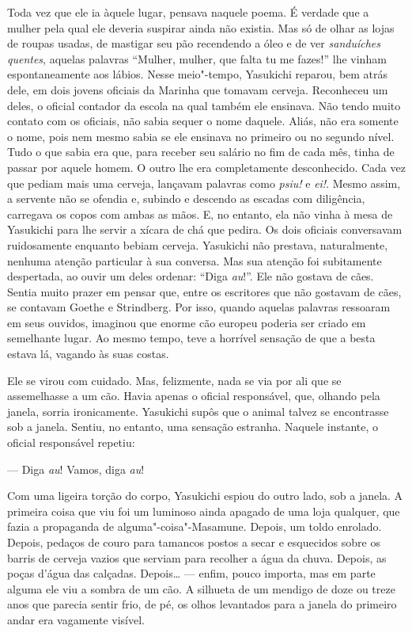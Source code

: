 Toda vez que ele ia àquele lugar, pensava naquele poema. É verdade que a
mulher pela qual ele deveria suspirar ainda não existia. Mas só de
olhar as lojas de roupas usadas, de mastigar seu pão recendendo a óleo
e de ver \textit{sanduíches quentes}, aquelas palavras ``Mulher,
mulher, que falta tu me fazes!'' lhe vinham espontaneamente aos lábios.
Nesse meio"-tempo, Yasukichi reparou, bem atrás dele, em dois jovens
oficiais da Marinha que tomavam cerveja. Reconheceu um deles, o oficial
contador da escola na qual também ele ensinava. Não tendo muito contato
com os oficiais, não sabia sequer o nome daquele. Aliás, não era
somente o nome, pois nem mesmo sabia se ele ensinava no primeiro ou no
segundo nível. Tudo o que sabia era que, para receber seu salário no
fim de cada mês, tinha de passar por aquele homem. O outro lhe era
completamente desconhecido. Cada vez que pediam mais uma cerveja,
lançavam palavras como \textit{psiu!} e \textit{ei!}. Mesmo assim, a servente não se
ofendia e, subindo e descendo as escadas com diligência, carregava os
copos com ambas as mãos. E, no entanto, ela não vinha à mesa de
Yasukichi para lhe servir a xícara de chá que pedira. Os dois oficiais
conversavam ruidosamente enquanto bebiam cerveja. Yasukichi não
prestava, naturalmente, nenhuma atenção particular à sua conversa. Mas
sua atenção foi subitamente despertada, ao ouvir um deles ordenar:
``Diga \textit{au}!''. Ele não gostava de cães. Sentia muito prazer em pensar que,
entre os escritores que não gostavam de cães, se contavam Goethe e
Strindberg. Por isso, quando aquelas palavras ressoaram em seus
ouvidos, imaginou que enorme cão europeu poderia ser criado em
semelhante lugar. Ao mesmo tempo, teve a horrível sensação de que a
besta estava lá, vagando às suas costas.

Ele se virou com cuidado. Mas, felizmente, nada se via por ali que se
assemelhasse a um cão. Havia apenas o oficial responsável, que, olhando
pela janela, sorria ironicamente. Yasukichi supôs que o animal talvez
se encontrasse sob a janela. Sentiu, no entanto, uma sensação estranha.
Naquele instante, o oficial responsável repetiu:

--- Diga \textit{au}! Vamos, diga \textit{au}!

Com uma ligeira torção do corpo, Yasukichi espiou do outro lado, sob a
janela. A primeira coisa que viu foi um luminoso ainda apagado de uma
loja qualquer, que fazia a propaganda de alguma"-coisa"-Masamune. Depois,
um toldo enrolado. Depois, pedaços de couro para tamancos postos a
secar e esquecidos sobre os barris de cerveja vazios que serviam para
recolher a água da chuva. Depois, as poças d'água das calçadas.
Depois\ldots{} --- enfim, pouco importa, mas em parte alguma ele viu a sombra
de um cão. A silhueta de um mendigo de doze ou treze anos que parecia
sentir frio, de pé, os olhos levantados para a janela do primeiro andar
era vagamente visível.


